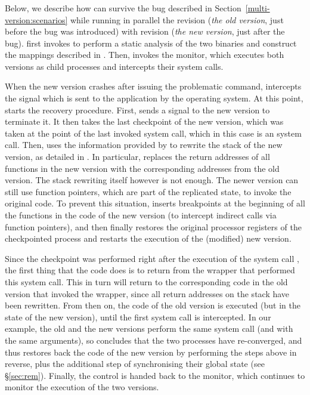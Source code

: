 \subsubsection{\redis}
\label{sec:redis}

Below, we describe how \mx can survive the \redis bug described in
Section~\ref{multi-version:scenarios} while running in parallel the \redis
revision  (\textit{the old version}, just before the bug was
introduced) with revision  (\textit{the new version}, just
after the bug).  \mx first invokes \sea to perform a static analysis of the two
binaries and construct the mappings described in .  Then, \mx
invokes the \mxm monitor, which executes both versions as child processes and
intercepts their system calls.

When the new version crashes after issuing the problematic
 command, \mxm intercepts the  signal
which is sent to the application by the operating system.  At
this point, \rem starts the recovery procedure.  First, \rem sends a
 signal to the new version to terminate it.  It then
takes the last checkpoint of the new version, which was taken at the
point of the last invoked system call, which in this case is an
 system call.  Then, \rem uses the information
provided by \sea to rewrite the stack of the new version, as detailed
in .  In particular, \rem replaces the return
addresses of all functions in the new version with the corresponding
addresses from the old version. The stack rewriting itself however is not
enough. The newer version can still use function pointers, which are
part of the replicated state, to invoke the original code. To prevent
this situation, \rem inserts breakpoints at the beginning of all the
functions in the code of the new version (to intercept indirect calls
via function pointers), and then finally restores the original processor
registers of the checkpointed process and restarts the execution of the
(modified) new version.

Since the checkpoint was performed right after the execution of the system
call , the first thing that the code does is to
return from the  wrapper that performed this system
call.  This in turn will return to the corresponding code in the old
version that invoked the wrapper, since all return addresses on the
stack have been rewritten.  From then on, the code of the old version
is executed (but in the state of the new version), until the first
system call is intercepted.  In our example, the old and the new
versions perform the same system call (and with the same arguments),
so \rem concludes that the two processes have re-converged, and thus
restores back the code of the new version by performing the steps
above in reverse, plus the additional step of synchronising their
global state (see \S\ref{sec:rem}).  Finally, the control is handed
back to the \mxm monitor, which continues to monitor the execution of
the two versions.

